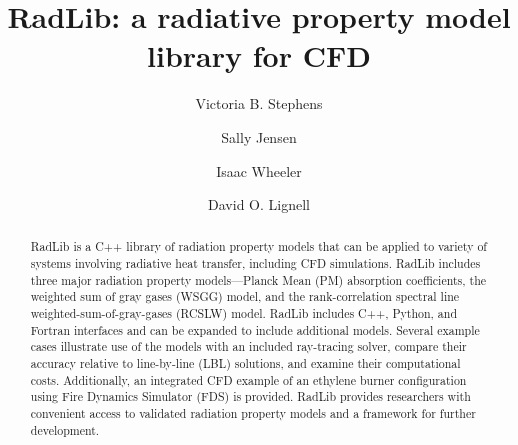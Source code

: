 \documentclass[preprint,12pt]{elsarticle}
\begin{document}
\begin{frontmatter}



\title{RadLib: a radiative property model library for CFD}




\author{Victoria B. Stephens}
\author{Sally Jensen}
\author{Isaac Wheeler}
\author{David O. Lignell}


\address{Department of Chemical Engineering, Brigham Young University, Provo, UT 84602, United States}


\begin{abstract}
RadLib is a C++ library of radiation property models that can be applied to variety of systems involving radiative heat transfer, including CFD simulations. RadLib includes three major radiation property models---Planck Mean (PM) absorption coefficients, the weighted sum of gray gases (WSGG) model, and the rank-correlation spectral line weighted-sum-of-gray-gases (RCSLW) model. RadLib includes C++, Python, and Fortran interfaces and can be expanded to include additional models. Several example cases illustrate use of the models with an included ray-tracing solver, compare their accuracy relative to line-by-line (LBL) solutions, and examine their computational costs. Additionally, an integrated CFD example of an ethylene burner configuration using Fire Dynamics Simulator (FDS) is provided.
RadLib provides researchers with convenient access to validated radiation property models and a framework for further development.
\end{abstract}


\end{frontmatter}
\end{document}
